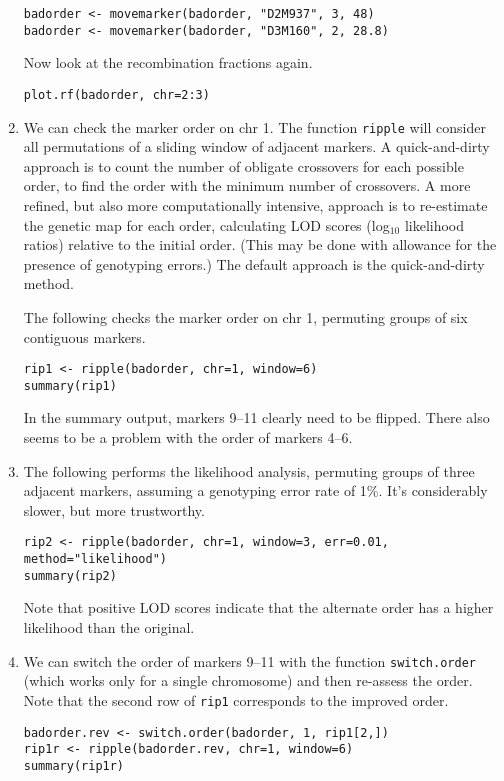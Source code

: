 \documentclass[10pt,letterpaper]{article}
\newcommand{\usercolor}{\color [named]{BlueViolet}}
\begin{document}
\begin{enumerate}
\usercolor \verb|badorder <- movemarker(badorder, "D2M937", 3, 48)| \\
\verb|badorder <- movemarker(badorder, "D3M160", 2, 28.8)| \normalcolor

Now look at the recombination fractions again.

\usercolor \verb|plot.rf(badorder, chr=2:3)| \normalcolor

\item We can check the marker order on chr 1.  The function
\verb-ripple- will consider all permutations of a sliding window of
adjacent markers.  A quick-and-dirty approach is to count the number
of obligate crossovers for each possible order, to find the order with
the minimum number of crossovers.  A more refined, but also more
computationally intensive, approach is to 
re-estimate the genetic map for each order, calculating LOD
scores (log$_{10}$ likelihood ratios) relative to the initial order.
(This may be done with allowance for the presence of genotyping
errors.)  The default approach is the quick-and-dirty method.

The following checks the marker order on chr 1, permuting
groups of six contiguous markers.  

\usercolor
\verb|rip1 <- ripple(badorder, chr=1, window=6)| \\
\verb|summary(rip1)| 
\normalcolor

In the summary output, markers 9--11 clearly need to be flipped.
There also seems to be a problem with the order of markers 4--6.  

\item The following performs the likelihood analysis, permuting groups of
three adjacent markers, assuming a genotyping error rate of
1\%.  It's considerably slower, but more trustworthy.
 
\usercolor 
\verb|rip2 <- ripple(badorder, chr=1, window=3, err=0.01, method="likelihood")| \\
\verb|summary(rip2)|
\normalcolor

Note that positive LOD scores indicate that the alternate order has a
higher likelihood than the original.

\item We can switch the order of markers 9--11 with the function
\verb-switch.order- (which works only for a single chromosome) and
then re-assess the order.  Note that the second row of \verb-rip1-
corresponds to the improved order.  

\usercolor
\verb|badorder.rev <- switch.order(badorder, 1, rip1[2,])| \\
\verb|rip1r <- ripple(badorder.rev, chr=1, window=6)| \\
\verb|summary(rip1r)|
\normalcolor


\end{enumerate}
\end{document}
